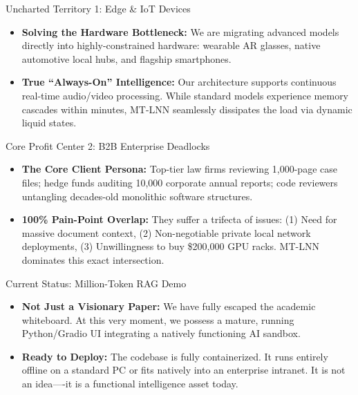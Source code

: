 ﻿\documentclass[aspectratio=169, 10pt]{beamer}
\begin{document}
\begin{frame}{Uncharted Territory 1: Edge \& IoT Devices}
\begin{itemize}
    \item \textbf{Solving the Hardware Bottleneck:} We are migrating advanced models directly into highly-constrained hardware: wearable AR glasses, native automotive local hubs, and flagship smartphones.
    \item \textbf{True ``Always-On'' Intelligence:} Our architecture supports continuous real-time audio/video processing. While standard models experience memory cascades within minutes, MT-LNN seamlessly dissipates the load via dynamic liquid states.
\end{itemize}
\end{frame}

\begin{frame}{Core Profit Center 2: B2B Enterprise Deadlocks}
\begin{itemize}
    \item \textbf{The Core Client Persona:} Top-tier law firms reviewing 1,000-page case files; hedge funds auditing 10,000 corporate annual reports; code reviewers untangling decades-old monolithic software structures.
    \item \textbf{100\% Pain-Point Overlap:} They suffer a trifecta of issues: (1) Need for massive document context, (2) Non-negotiable private local network deployments, (3) Unwillingness to buy \$200,000 GPU racks. MT-LNN dominates this exact intersection.
\end{itemize}
\end{frame}

\begin{frame}{Current Status: Million-Token RAG Demo}
\begin{itemize}
    \item \textbf{Not Just a Visionary Paper:} We have fully escaped the academic whiteboard. At this very moment, we possess a mature, running Python/Gradio UI integrating a natively functioning AI sandbox.
    \item \textbf{Ready to Deploy:} The codebase is fully containerized. It runs entirely offline on a standard PC or fits natively into an enterprise intranet. It is not an idea----it is a functional intelligence asset today.
\end{itemize}
\end{frame}
\end{document}

